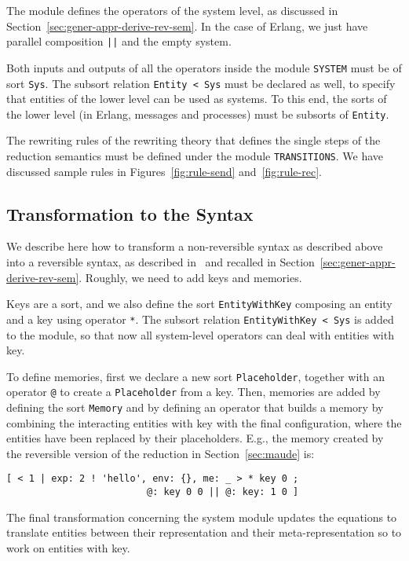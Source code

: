 \documentclass{article}[12pt,a4paper]
\theoremstyle{definition}
\begin{document}
The module defines the operators of the system level, as discussed in Section~\ref{sec:gener-appr-derive-rev-sem}. In the case of Erlang, we just have parallel composition \verb+||+ and the empty system.

Both inputs and outputs of all the operators inside the module \verb+SYSTEM+ must be of sort
\verb+Sys+. The subsort
relation \verb+Entity < Sys+ must be declared as well, to specify that
entities of the lower level can be used as systems.
To this end, the sorts of the lower level (in Erlang, messages and processes) must be subsorts of
\verb+Entity+.

The rewriting rules of the rewriting theory that defines the
single steps of the reduction semantics must be defined under the module
\verb+TRANSITIONS+. We have discussed sample rules in Figures~\ref{fig:rule-send} and~\ref{fig:rule-rec}.

\subsection{Transformation to the Syntax}
We describe here how to transform a non-reversible syntax as
described above into a reversible syntax, as described
in~\cite{LaneseM20} and recalled in
Section~\ref{sec:gener-appr-derive-rev-sem}. Roughly, we need to add
keys and memories.

Keys are a sort, and we also define the sort \verb+EntityWithKey+ composing an entity and a key using operator \verb+*+.
The subsort relation \verb+EntityWithKey < Sys+ is added to the module, so that now all system-level
operators can deal with entities with key. 

To define memories, first we declare a new sort \verb+Placeholder+,
together with an operator \verb+@+ to create a \verb+Placeholder+ from a key.
Then, memories are added by defining the sort \verb+Memory+ and by defining an
operator that builds a memory by combining the interacting entities with key with the final configuration, where the
entities have been replaced by their placeholders. E.g., the memory created by the reversible version of the reduction in Section~\ref{sec:maude} is:

\begin{verbatim}
[ < 1 | exp: 2 ! 'hello', env: {}, me: _ > * key 0 ; 
                         @: key 0 0 || @: key: 1 0 ]
\end{verbatim}

The final transformation concerning the system module updates the
equations to translate entities between their representation and their
meta-representation so to work on entities with key.
\end{document}

